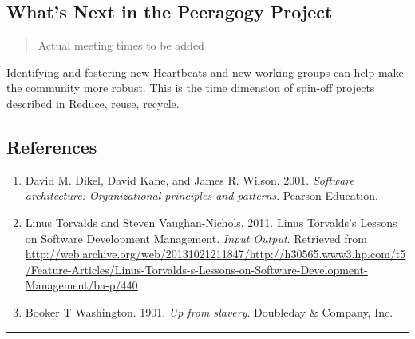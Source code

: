 \hypertarget{whats-next-in-the-peeragogy-project}{%
\subsection{What's Next in the Peeragogy
Project}\label{whats-next-in-the-peeragogy-project}}

\begin{quote}
Actual meeting times to be added
\end{quote}

Identifying and fostering new {{Heartbeats}} and new working groups can
help make the community more robust. This is the time dimension of
spin-off projects described in {{Reduce, reuse, recycle}}.

\hypertarget{references}{%
\subsection{References}\label{references}}

\begin{enumerate}
\def\labelenumi{\arabic{enumi}.}
\item
  David M. Dikel, David Kane, and James R. Wilson. 2001. \emph{Software
  architecture: Organizational principles and patterns}. Pearson
  Education.
\item
  Linus Torvalds and Steven Vaughan-Nichols. 2011. Linus Torvalds's
  Lessons on Software Development Management. \emph{Input Output}.
  Retrieved from
  \url{http://web.archive.org/web/20131021211847/http://h30565.www3.hp.com/t5/Feature-Articles/Linus-Torvalds-s-Lessons-on-Software-Development-Management/ba-p/440}
\item
  Booker T Washington. 1901. \emph{Up from slavery}. Doubleday \&
  Company, Inc.
\end{enumerate}

\begin{center}\rule{0.5\linewidth}{0.5pt}\end{center}
